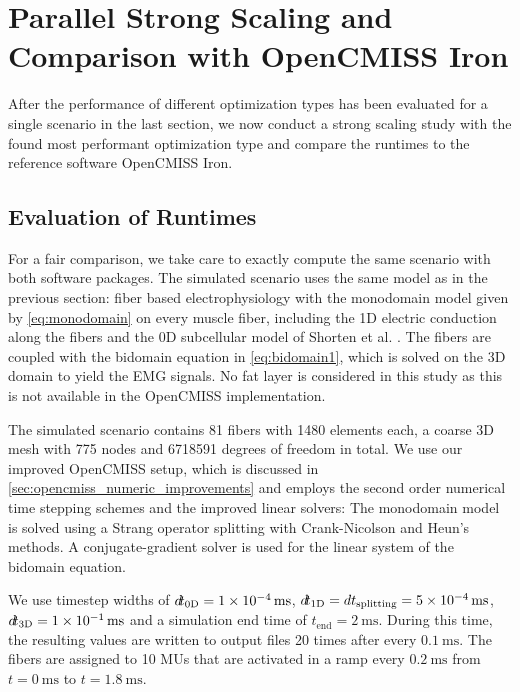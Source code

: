 


\section{Parallel Strong Scaling and Comparison with OpenCMISS Iron}

After the performance of different optimization types has been evaluated for a single scenario in the last section, we now conduct a strong scaling study with the found most performant optimization type and compare the runtimes to the reference software OpenCMISS Iron.

\subsection{Evaluation of Runtimes}\label{sec:strong_scaling_runtimes_opencmiss_opendihu}
For a fair comparison, we take care to exactly compute the same scenario with both software packages. The simulated scenario uses the same model as in the previous section: fiber based electrophysiology with the monodomain model given by \cref{eq:monodomain} on every muscle fiber, including the 1D electric conduction along the fibers and the 0D subcellular model of Shorten et al. \cite{Shorten2007}. The fibers are coupled with the bidomain equation in \cref{eq:bidomain1}, which is solved on the 3D domain to yield the EMG signals. No fat layer is considered in this study as this is not available in the OpenCMISS implementation.

The simulated scenario contains 81 fibers with \num{1480} elements each, a coarse 3D mesh with \num{775} nodes and \num{6718591} degrees of freedom in total. 
We use our improved OpenCMISS setup, which is discussed in \cref{sec:opencmiss_numeric_improvements} and employs the second order numerical time stepping schemes and the improved linear solvers:
The monodomain model is solved using a Strang operator splitting with Crank-Nicolson and Heun's methods. A conjugate-gradient solver is used for the linear system of the bidomain equation.

We use timestep widths of $\dt_\text{0D}=\SI{1e-4}{\milli\second}$, $\dt_\text{1D}=dt_\text{splitting}=\SI{5e-4}{\milli\second}$, $\dt_\text{3D}=\SI{1e-1}{\milli\second}$ and a simulation end time of $t_\text{end}=\SI{2}{\milli\second}$. 
During this time, the resulting values are written to output files 20 times after every $\SI{0.1}{\milli\second}$. 
The fibers are assigned to 10 MUs that are activated in a ramp every $\SI{0.2}{\milli\second}$ from $t=\SI{0}{\milli\second}$ to $t=\SI{1.8}{\milli\second}$.

